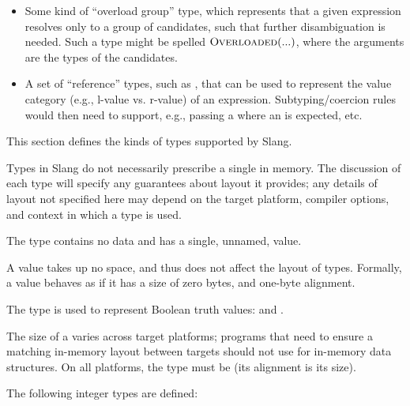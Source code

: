 \begin{TODO}
\begin{itemize}
\item Some kind of ``overload group'' type, which represents that a given expression resolves only to a group of candidates, such that further disambiguation is needed. Such a type might be spelled $\textsc{Overloaded}(...)$, where the arguments are the types of the candidates.

\item A set of ``reference'' types, such as , that can be used to represent the value category (e.g., l-value vs. r-value) of an expression. Subtyping/coercion rules would then need to support, e.g., passing a  where an  is expected, etc.
\end{itemize}

\end{TODO}


This section defines the kinds of types supported by Slang.


Types in Slang do not necessarily prescribe a single  in memory.
The discussion of each type will specify any guarantees about layout it provides; any details of layout not specified here may depend on the target platform, compiler options, and context in which a type is used.


The type  contains no data and has a single, unnamed, value.

A  value takes up no space, and thus does not affect the layout of types.
Formally, a  value behaves as if it has a size of zero bytes, and one-byte alignment.



The type  is used to represent Boolean truth values:  and .

The size of a  varies across target platforms; programs that need to ensure a matching in-memory layout between targets should not use  for in-memory data structures.
On all platforms, the  type must be  (its alignment is its size).


The following integer types are defined:

